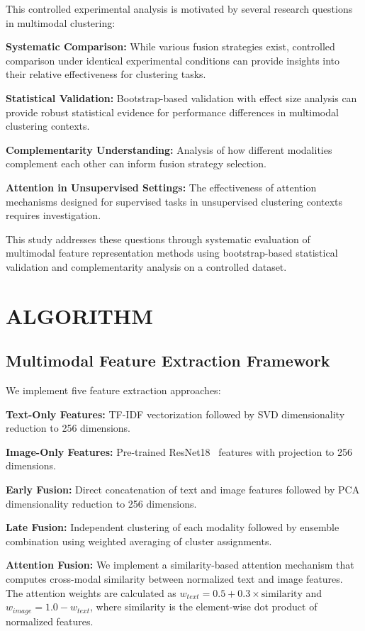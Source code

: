 \documentclass[sigconf]{acmart}
\begin{document}
This controlled experimental analysis is motivated by several research questions in multimodal clustering:

\textbf{Systematic Comparison:} While various fusion strategies exist, controlled comparison under identical experimental conditions can provide insights into their relative effectiveness for clustering tasks.

\textbf{Statistical Validation:} Bootstrap-based validation with effect size analysis can provide robust statistical evidence for performance differences in multimodal clustering contexts.

\textbf{Complementarity Understanding:} Analysis of how different modalities complement each other can inform fusion strategy selection.

\textbf{Attention in Unsupervised Settings:} The effectiveness of attention mechanisms designed for supervised tasks in unsupervised clustering contexts requires investigation.

This study addresses these questions through systematic evaluation of multimodal feature representation methods using bootstrap-based statistical validation and complementarity analysis on a controlled dataset.

\section{ALGORITHM}

\subsection{Multimodal Feature Extraction Framework}

We implement five feature extraction approaches:

\textbf{Text-Only Features:} TF-IDF vectorization followed by SVD dimensionality reduction to 256 dimensions.

\textbf{Image-Only Features:} Pre-trained ResNet18~\cite{he2016deep} features with projection to 256 dimensions.

\textbf{Early Fusion:} Direct concatenation of text and image features followed by PCA dimensionality reduction to 256 dimensions.

\textbf{Late Fusion:} Independent clustering of each modality followed by ensemble combination using weighted averaging of cluster assignments.

\textbf{Attention Fusion:} We implement a similarity-based attention mechanism that computes cross-modal similarity between normalized text and image features. The attention weights are calculated as $w_{text} = 0.5 + 0.3 \times \text{similarity}$ and $w_{image} = 1.0 - w_{text}$, where similarity is the element-wise dot product of normalized features.
\end{document}
